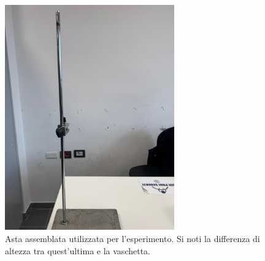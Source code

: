 \begin{figure}[H]
	\centering
	\includegraphics[width=0.65\textwidth]{./figures/asta}
	\caption{Asta assemblata utilizzata per l'esperimento. Si noti la differenza di altezza tra quest'ultima e la vaschetta.}
\end{figure}